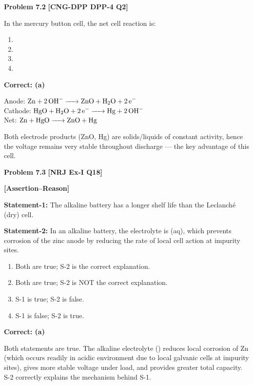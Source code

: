 \begin{problembox}
\textbf{Problem 7.2} \hfill \textbf{[CNG-DPP DPP-4 Q2]}

In the mercury button cell, the net cell reaction is:
\begin{enumerate}[label=(\alph*)]
    \item {}
    \item {}
    \item {}
    \item {}
\end{enumerate}
\end{problembox}
\begin{solution}
\textbf{Correct: (a)}

Anode: $\ce{Zn + 2OH- -> ZnO + H2O + 2e-}$\\
Cathode: $\ce{HgO + H2O + 2e- -> Hg + 2OH-}$\\
Net: $\ce{Zn + HgO -> ZnO + Hg}$

Both electrode products (ZnO, Hg) are solids/liquids of constant activity, hence the voltage remains very stable throughout discharge --- the key advantage of this cell.
\end{solution}

\begin{problembox}
\textbf{Problem 7.3} \hfill \textbf{[NRJ Ex-I Q18]}

\textbf{[Assertion--Reason]}

\textbf{Statement-1:} The alkaline battery has a longer shelf life than the Leclanch\'{e} (dry) cell.

\textbf{Statement-2:} In an alkaline battery, the electrolyte is (aq), which prevents corrosion of the zinc anode by reducing the rate of local cell action at impurity sites.

\begin{enumerate}[label=(\alph*)]
    \item Both are true; S-2 is the correct explanation.
    \item Both are true; S-2 is NOT the correct explanation.
    \item S-1 is true; S-2 is false.
    \item S-1 is false; S-2 is true.
\end{enumerate}
\end{problembox}
\begin{solution}
\textbf{Correct: (a)}

Both statements are true. The alkaline electrolyte () reduces local corrosion of Zn (which occurs readily in acidic  environment due to local galvanic cells at impurity sites), gives more stable voltage under load, and provides greater total capacity. S-2 correctly explains the mechanism behind S-1.
\end{solution}

